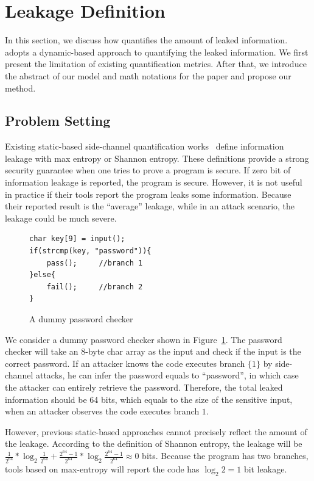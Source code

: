 \section{\tool{} Leakage Definition}
\label{sec:trace-qif}
In this section, we discuss how \tool{} quantifies the amount of leaked
information. \tool{} adopts a dynamic-based approach to quantifying the leaked
information. We first present the limitation of existing quantification metrics.
After that, we introduce the abstract of our model and math notations for the
paper and propose our method.

\subsection{Problem Setting}
Existing static-based side-channel quantification
works~\cite{182946,Wichelmann:2018:MFF:3274694.3274741 } define information
leakage with max entropy or Shannon entropy. These definitions provide a strong
security guarantee when one tries to prove a program is secure.  If zero bit of
information leakage is reported, the program is secure. However, it is not
useful in practice if their tools report the program leaks some information.
Because their reported result is the ``average'' leakage, while in an attack
scenario, the leakage could be much severe.


\begin{figure}[h!]
    \centering
    \begin{lstlisting}[xleftmargin=.03\textwidth,xrightmargin=.01\textwidth]
char key[9] = input();
if(strcmp(key, "password")){
    pass();     //branch 1
}else{
    fail();     //branch 2
}
\end{lstlisting}
    \caption{A dummy password checker}
    \label{fig:password-checker}
\end{figure}

We consider a dummy password checker shown in Figure~\ref{fig:password-checker}.
The password checker will take an 8-byte char array as the input and check if
the input is the correct password. If an attacker knows the code executes branch
$\{{1\}}$ by side-channel attacks, he can infer the password equals to
``password'', in which case the attacker can entirely retrieve the password.
Therefore, the total leaked information should be 64 bits, which equals to the
size of the sensitive input, when an attacker observes the code executes branch
$1$.

However, previous static-based approaches cannot precisely reflect the amount of
the leakage. According to the definition of Shannon entropy, the leakage will be
$\frac{1}{2^{64}}*\log_{2}\frac{1}{2^{64}} + \frac{2^{64}-1}{2^{64}}
*\log_{2}\frac{2^{64}-1}{2^{64}} \approx 0$ bits. Because the program has two
branches, tools based on max-entropy will report the code has $\log_2{2} = 1$
bit leakage.

